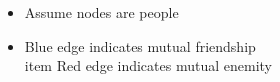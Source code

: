 \documentclass[preview]{standalone}
\begin{document}
\begin{center}
\begin{itemize} \item Assume nodes are people \\ \item Blue edge indicates mutual friendship \\ item Red edge indicates mutual enemity \end{itemize}
\end{center}
\end{document}
